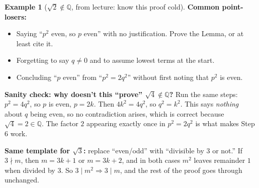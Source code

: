 \documentclass[11pt]{article}
\theoremstyle{definition}
\newtheorem{ex}[defn]{Example}
\newcommand{\Q}{\mathbb{Q}}
\newcommand{\key}[1]{\textcolor{red!70!black}{\textbf{#1}}}
\begin{document}
\begin{ex}[$\sqrt2\notin\Q$, from lecture: know this proof cold]
\noindent\key{Common point-losers:}
\begin{itemize}[nosep]
  \item Saying ``$p^2$ even, so $p$ even'' with no justification. Prove the
        Lemma, or at least cite it.
  \item Forgetting to say $q\ne0$ and to assume lowest terms at the start.
  \item Concluding ``$p$ even'' from ``$p^2=2q^2$'' without first noting
        that $p^2$ is even.
\end{itemize}

\noindent\key{Sanity check: why doesn't this ``prove'' $\sqrt4\notin\Q$?}
Run the same steps: $p^2=4q^2$, so $p$ is even, $p=2k$. Then $4k^2=4q^2$,
so $q^2=k^2$. This says \emph{nothing} about $q$ being even, so no
contradiction arises, which is correct because $\sqrt4=2\in\Q$. The factor
$2$ appearing exactly once in $p^2=2q^2$ is what makes Step 6 work.

\noindent\key{Same template for $\sqrt3$:} replace ``even/odd'' with
``divisible by $3$ or not.'' If $3\nmid m$, then $m=3k+1$ or $m=3k+2$, and
in both cases $m^2$ leaves remainder $1$ when divided by $3$. So
$3\mid m^2\Rightarrow 3\mid m$, and the rest of the proof goes through
unchanged.
\end{ex}
\end{document}
